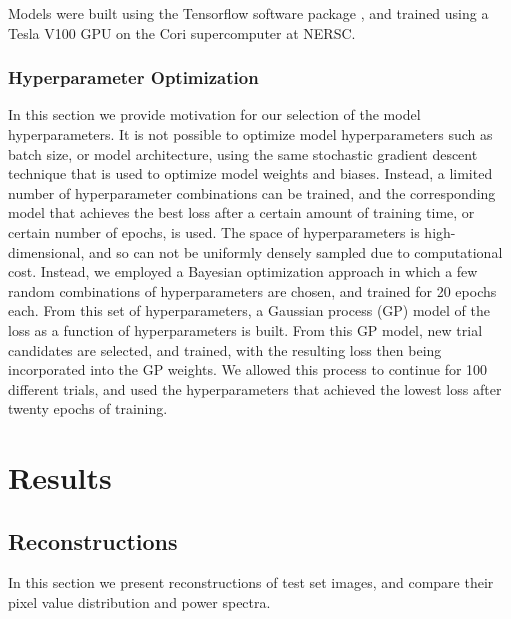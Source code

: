 \documentclass[fleqn,usenatbib]{mnras}
\begin{document}
 Models were built using the Tensorflow software package \citep{tensorflow}, and trained using a Tesla V100 GPU on the Cori supercomputer at NERSC.
 

\subsubsection{Hyperparameter Optimization}
\label{sec:hyperparameter_optimization} 

In this section we provide motivation for our selection of the model hyperparameters. It is not possible to optimize model hyperparameters such as batch size, or model architecture, using the same stochastic gradient descent technique that is used to optimize model weights and biases. Instead, a limited number of hyperparameter combinations can be trained, and the corresponding model that achieves the best loss after a certain amount of training time, or certain number of epochs, is used. The space of hyperparameters is high-dimensional, and so can not be uniformly densely sampled due to computational cost. Instead, we employed a Bayesian optimization approach in which a few random combinations of hyperparameters are chosen, and trained for 20 epochs each. From this set of hyperparameters, a Gaussian process (GP) model of the loss as a function of hyperparameters is built. From this GP model, new trial candidates are selected, and trained, with the resulting loss then being incorporated into the GP weights. We allowed this process to continue for 100 different trials, and used the hyperparameters that achieved the lowest loss after twenty epochs of training. 

\section{Results}
\label{sec:results} 

\subsection{Reconstructions}
\label{sec:recall} 

In this section we present reconstructions of test set images, and compare their pixel value distribution and power spectra. 
\end{document}
